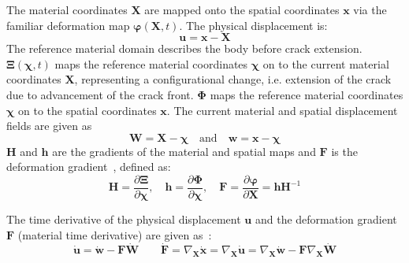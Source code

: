 \documentclass[onecolumn]{svjour3}
\begin{document}
The material coordinates $\mathbf{X}$ are mapped onto the spatial coordinates $\mathbf{x}$ via the
familiar deformation map $\boldsymbol\varphi(\mathbf{X},t)$. The physical displacement is:
\begin{equation}
\mathbf{u}=\mathbf{x}-\mathbf{X}
\end{equation}
The reference material domain describes the body before crack extension. ${\boldsymbol\Xi}(\boldsymbol\chi,t)$ maps the reference material coordinates $\boldsymbol\chi$ on to the current material coordinates $\mathbf{X}$, representing a configurational change, i.e. extension of the crack due to advancement of the crack front. ${\boldsymbol\Phi}$ maps the reference material coordinates $\boldsymbol\chi$ on to the spatial coordinates $\mathbf{x}$. The current material and spatial displacement fields are given as
\begin{equation}
\mathbf{W} = \mathbf{X} - {\boldsymbol\chi}\quad\textrm{and}\quad
\mathbf{w} = \mathbf{x} - {\boldsymbol\chi}
\end{equation}
$\mathbf{H}$ and $\mathbf{h}$ are the gradients of the material and spatial maps and $\mathbf{F}$ is the deformation gradient~\cite{kaczmarczyk2014three}, defined as:
\begin{equation}
\mathbf{H}=\frac{\partial {\boldsymbol\Xi}}{\partial {\boldsymbol\chi}},\quad\mathbf{h}=\frac{\partial {\boldsymbol\Phi}}{\partial {\boldsymbol\chi}},\quad\mathbf{F} = \frac{\partial \boldsymbol\varphi}{\partial \mathbf{X}} = \mathbf{h}\mathbf{H}^{-1}
\end{equation}


The time derivative of the physical displacement $\mathbf{u}$ and the deformation gradient $\mathbf{F}$ (material time derivative) are given as~\cite{kaczmarczyk2014three}:
\begin{equation}\label{eq:phy_vel}
\dot{\mathbf{u}}= \dot{\mathbf{w}}-\mathbf{F}\dot{\mathbf{W}} \qquad 
\dot{\mathbf{F}} = \nabla_\mathbf{X} \dot{\mathbf{x}} = \nabla_\mathbf{X} \dot{\mathbf{u}} = 
\nabla_\mathbf{X} \dot{\mathbf{w}} - \mathbf{F} \nabla_\mathbf{X} \dot{\mathbf{W}}
\end{equation}
 
\end{document}
